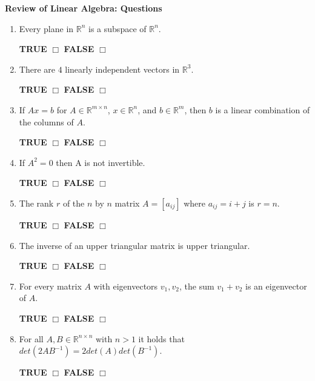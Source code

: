 \documentclass[14pt]{report}
\begin{document}
\textbf{{Review of Linear Algebra: Questions}}\\
\thispagestyle{empty}

\begin{enumerate}
\item Every plane in $\mathbb{R}^n$ is a subspace of $\mathbb{R}^n$.  

\quad \textbf{TRUE} $\Box$ \quad\textbf{FALSE} $\Box$ 

\item There are $4$ linearly independent vectors in $\mathbb{R}^3$. 

\quad \textbf{TRUE} $\Box$ \quad\textbf{FALSE} $\Box$ 

\item If $Ax=b$ for $A \in \mathbb{R}^{m\times n}$, $x\in\mathbb{R}^n$, and  $b\in\mathbb{R}^m$, then $b$ is a linear combination of the columns of $A$.

\quad \textbf{TRUE} $\Box$ \quad\textbf{FALSE} $\Box$

\item If $A^2=0$ then A is not invertible.

\quad \textbf{TRUE} $\Box$ \quad\textbf{FALSE} $\Box$ 



\item The rank $r$ of the $n$ by $n$ matrix $A=[a_{ij}]$ where $a_{ij}=i+j$ is $r=n$.

 \quad \textbf{TRUE} $\Box$ \quad\textbf{FALSE} $\Box$


 

\item The inverse of an upper triangular matrix is upper triangular. 

\quad \textbf{TRUE} $\Box$ \quad\textbf{FALSE} $\Box$ 

\item For every  matrix $A$ with eigenvectors $v_1, v_2$, the sum $v_1 + v_2$ is an eigenvector of $A$. 

\quad \textbf{TRUE} $\Box$ \quad\textbf{FALSE} $\Box$ 

\item For all $A,B \in \mathbb{R}^{n \times n}$ with $n >1$ it holds that $det(2AB^{-1})=2det(A)det(B^{-1})$. 

\quad \textbf{TRUE} $\Box$ \quad\textbf{FALSE} $\Box$ 


\end{enumerate}
\end{document}
